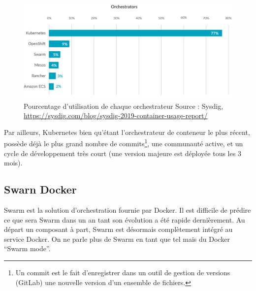 \documentclass[11pt,fleqn]{book} %
\begin{document}
\begin{figure}[H]\centering
\renewcommand{\figurename}{Graphique}
\includegraphics[scale=0.3]{Pictures/orchestrators-2019.png}
\captionsetup{margin=1.5cm,format=hang,justification=justified}
\caption[]{Pourcentage d'utilisation de chaque orchestrateur\newline
Source : Sysdig, \url{https://sysdig.com/blog/sysdig-2019-container-usage-report/}}
\end{figure}

Par ailleurs, Kubernetes bien qu'étant l'orchestrateur de conteneur le plus récent, possède déjà le plus grand nombre de commits\footnote{Un commit est le fait d'enregistrer dans un outil de gestion de versions (GitLab) une nouvelle version d'un ensemble de fichiers.}, une communauté active, et un cycle de développement très court (une version majeure est déployée tous les 3 mois).



\subsection{Swarn Docker}
Swarm est la solution d’orchestration fournie par Docker. Il est difficile de prédire ce que sera Swarm dans un an tant son évolution a été rapide dernièrement. Au départ un composant à part, Swarm est désormais complètement intégré au service Docker. On ne parle plus de Swarm en tant que tel mais du Docker “Swarm mode”.\\
\end{document}
